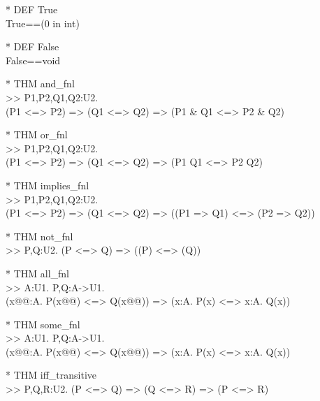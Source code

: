 \begin{prl*}
\>* DEF True\\
\>  True==(0 in int)
\end{prl*}

\begin{prl*}
\>* DEF False\\
\>  False==void
\end{prl*}

\begin{prl*}
\>* THM and\_fnl\\
\>  >> \mforall{}P1,P2,Q1,Q2:U2. \\
\>    (P1 <=> P2) => (Q1 <=> Q2) => (P1 \& Q1 <=> P2 \& Q2)
\end{prl*}

\begin{prl*}
\>* THM or\_fnl\\
\>  >> \mforall{}P1,P2,Q1,Q2:U2. \\
\>    (P1 <=> P2) => (Q1 <=> Q2) => (P1 \mvee{} Q1 <=> P2 \mvee{} Q2)
\end{prl*}

\begin{prl*}
\>* THM implies\_fnl\\
\>  >> \mforall{}P1,P2,Q1,Q2:U2. \\
\>   (P1 <=> P2) => (Q1 <=> Q2) => ((P1 => Q1) <=> (P2 => Q2))
\end{prl*}

\begin{prl*}
\>* THM not\_fnl\\
\>  >> \mforall{}P,Q:U2. (P <=> Q) => (\mneg{}(P) <=> \mneg{}(Q))
\end{prl*}

\begin{prl*}
\>* THM all\_fnl\\
\>  >> \mforall{}A:U1. \mforall{}P,Q:A->U1. \\
\>    (\mforall{}x@@:A. P(x@@) <=> Q(x@@)) => (\mforall{}x:A. P(x) <=> \mforall{}x:A. Q(x))
\end{prl*}

\begin{prl*}
\>* THM some\_fnl\\
\>  >> \mforall{}A:U1. \mforall{}P,Q:A->U1. \\
\>    (\mforall{}x@@:A. P(x@@) <=> Q(x@@)) => (\mexists{}x:A. P(x) <=> \mexists{}x:A. Q(x))
\end{prl*}

\begin{prl*}
\>* THM iff\_transitive\\
\>  >> \mforall{}P,Q,R:U2. (P <=> Q) => (Q <=> R) => (P <=> R)
\end{prl*}

